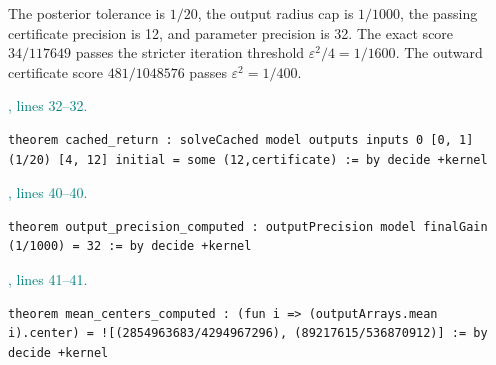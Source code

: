 \documentclass[11pt]{article}\usepackage{needspace}\renewcommand{\paperkind}{Lean companion}\setlength{\parskip}{0.35em}
\begin{document}
The posterior tolerance is $1/20$, the output radius cap is $1/1000$, the passing certificate precision is 12, and parameter precision is 32. The exact score $34/117649$ passes the stricter iteration threshold $\varepsilon^2/4=1/1600$. The outward certificate score $481/1048576$ passes $\varepsilon^2=1/400$.



{\small\textcolor{teal}{, lines 32--32.}\par}

\begin{lstlisting}[style=BayesSource]
theorem cached_return : solveCached model outputs inputs 0 [0, 1] (1/20) [4, 12] initial = some (12,certificate) := by decide +kernel
\end{lstlisting}



{\small\textcolor{teal}{, lines 40--40.}\par}

\begin{lstlisting}[style=BayesSource]
theorem output_precision_computed : outputPrecision model finalGain (1/1000) = 32 := by decide +kernel
\end{lstlisting}



{\small\textcolor{teal}{, lines 41--41.}\par}

\begin{lstlisting}[style=BayesSource]
theorem mean_centers_computed : (fun i => (outputArrays.mean i).center) = ![(2854963683/4294967296), (89217615/536870912)] := by decide +kernel
\end{lstlisting}
\end{document}
